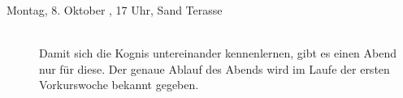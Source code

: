 \begin{description}




\ifkogwiss

    \item[Montag, 8. Oktober \YEAR, 17 Uhr, Sand Terasse ]\ \\
    Damit sich die Kognis untereinander kennenlernen, gibt es einen Abend nur für diese. Der genaue Ablauf des Abends wird im Laufe der ersten Vorkurswoche bekannt gegeben.
\fi


\end{description}
